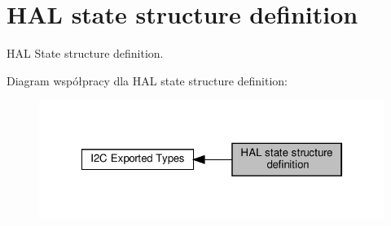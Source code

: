 \hypertarget{group___h_a_l__state__structure__definition}{}\section{H\+AL state structure definition}
\label{group___h_a_l__state__structure__definition}


H\+AL State structure definition.  


Diagram współpracy dla H\+AL state structure definition\+:\nopagebreak
\begin{figure}[H]
\begin{center}
\leavevmode
\includegraphics[width=322pt]{group___h_a_l__state__structure__definition}
\end{center}
\end{figure}

